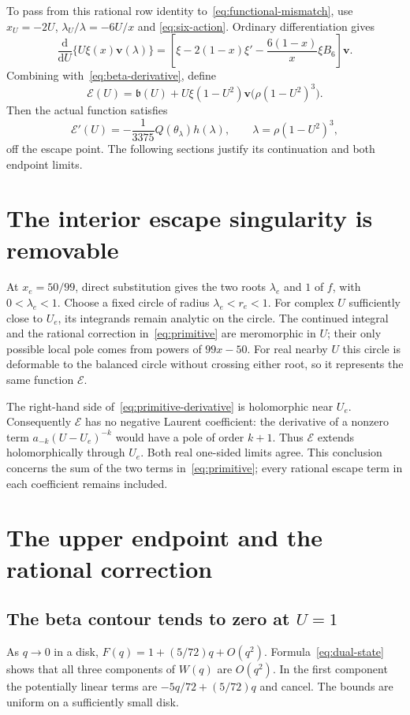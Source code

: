 \documentclass[11pt,a4paper]{article}
\newcommand{\dd}{\mathrm d}
\newcommand{\vv}{\mathbf v}
\begin{document}
To pass from this rational row identity to~\eqref{eq:functional-mismatch},
use $x_U=-2U$, $\lambda_U/\lambda=-6U/x$ and
\eqref{eq:six-action}. Ordinary differentiation gives
\[
 \frac{\dd}{\dd U}\{U\xi(x)\vv(\lambda)\}
 =\left[\xi-2(1-x)\xi'-\frac{6(1-x)}x\xi B_6\right]\vv.
\]
Combining with~\eqref{eq:beta-derivative}, define
\begin{equation}\label{eq:primitive}
 \boxed{\mathcal E(U)=\mathfrak b(U)+U\xi(1-U^2)
                  \vv\bigl(\rho(1-U^2)^3\bigr).}
\end{equation}
Then the actual function satisfies
\begin{equation}\label{eq:primitive-derivative}
 \mathcal E'(U)=-\frac1{3375}Q(\theta_\lambda)h(\lambda),
 \qquad \lambda=\rho(1-U^2)^3,
\end{equation}
off the escape point. The following sections justify its continuation
and both endpoint limits.

\section{The interior escape singularity is removable}
At $x_e=50/99$, direct substitution gives the two roots $\lambda_e$ and
$1$ of $f$, with $0<\lambda_e<1$. Choose a fixed circle of radius
$\lambda_e<r_e<1$. For complex $U$ sufficiently close to $U_e$, its
integrands remain analytic on the circle. The continued integral and the
rational correction in~\eqref{eq:primitive} are meromorphic in $U$;
their only possible local pole comes from powers of $99x-50$.
For real nearby $U$ this circle is deformable to the balanced circle without
crossing either root, so it represents the same function $\mathcal E$.

The right-hand side of~\eqref{eq:primitive-derivative} is holomorphic near
$U_e$. Consequently $\mathcal E$ has no negative Laurent coefficient:
the derivative of a nonzero term $a_{-k}(U-U_e)^{-k}$ would have a pole
of order $k+1$. Thus $\mathcal E$ extends holomorphically through $U_e$.
Both real one-sided limits agree. This conclusion concerns the sum of the
two terms in~\eqref{eq:primitive}; every rational escape term in each
coefficient remains included.

\section{The upper endpoint and the rational correction}
\subsection{The beta contour tends to zero at \texorpdfstring{$U=1$}{U=1}}
As $q\to0$ in a disk,
$F(q)=1+(5/72)q+O(q^2)$. Formula~\eqref{eq:dual-state} shows that all
three components of $W(q)$ are $O(q^2)$. In the first component the
potentially linear terms are $-5q/72+(5/72)q$ and cancel.
The bounds are uniform on a sufficiently small disk.
\end{document}
